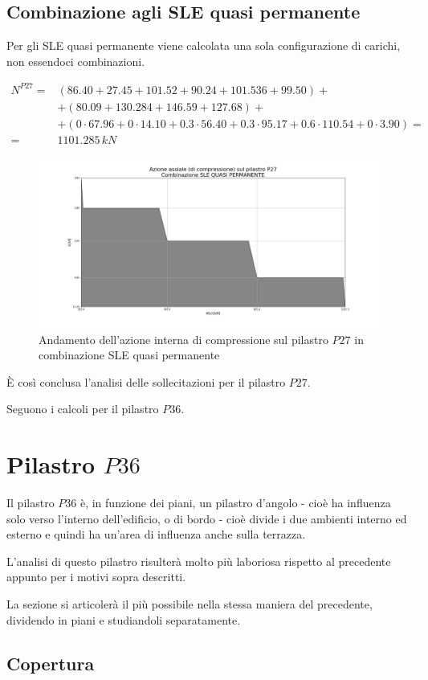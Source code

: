 \subsection{Combinazione agli SLE quasi permanente}
Per gli SLE quasi permanente viene calcolata una sola configurazione di carichi, non essendoci combinazioni.

\begin{align*}
	N^{P27} =& (86.40+27.45+101.52+90.24+101.536+99.50)+\\
	&+(80.09+130.284+146.59+127.68)+\\	&+(0\cdot67.96+0\cdot14.10+0.3\cdot56.40+0.3\cdot95.17+0.6\cdot110.54+0\cdot3.90) =\\
	=& 1101.285\,kN
\end{align*}


\begin{figure}
	\centering
	\includegraphics[width=.8\textwidth]{../../export/img/P27_axialLoad_sleQP}
	\caption{Andamento dell'azione interna di compressione sul pilastro $P27$ in combinazione SLE quasi permanente}
	\label{fig:P27axialLoad_sleQP}
\end{figure}

È così conclusa l'analisi delle sollecitazioni per il pilastro $P27$. 

Seguono i calcoli per il pilastro $P36$.
\cleardoublepage


\section{Pilastro $P36$}
Il pilastro $P36$ è, in funzione dei piani, un pilastro d'angolo - cioè ha influenza solo verso l'interno dell'edificio, o di bordo - cioè divide i due ambienti interno ed esterno e quindi ha un'area di influenza anche sulla terrazza.

L'analisi di questo pilastro risulterà molto più laboriosa rispetto al precedente appunto per i motivi sopra descritti.

La sezione si articolerà il più possibile nella stessa maniera del precedente, dividendo in piani e studiandoli separatamente.

\subsection{Copertura}
